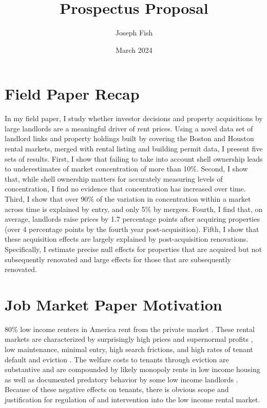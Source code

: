 \documentclass{article}
\title{Prospectus Proposal}
\author{Joseph Fish}
\date{March 2024}
\begin{document}
\section{Field Paper Recap}
In my field paper, I study whether investor decisions and property acquisitions by large landlords are a meaningful driver of rent prices. Using a novel data set of landlord links and property holdings built by \cite{Gomory_2024} covering the Boston and Houston rental markets, merged with rental listing and building permit data, I present five sets of results. First, I show that failing to take into account shell ownership leads to underestimates of market concentration of more than 10\%. Second, I show that, while shell ownership matters for accurately measuring levels of concentration, I find no evidence that concentration has increased over time. Third, I show that over 90\% of the variation in concentration within a market across time is explained by entry, and only 5\% by mergers. Fourth, I find that, on average, landlords raise prices by 1.7 percentage points after acquiring properties (over 4 percentage points by the fourth year post-acquisition). Fifth, I show that these acquisition effects are largely explained by post-acquisition renovations. Specifically, I estimate precise null effects for properties that are acquired but not subsequently renovated and large effects for those that are subsequently renovated.

\section{Job Market Paper Motivation}

80\% low income renters in America rent from the private market \parencite{jchs_2024, nhpd2024profiles}. These rental markets are characterized by surprisingly high prices and supernormal profits \parencite{Desmond_2019, Damen_2025,Eisfeldt_2015}, low maintenance, minimal entry, high search frictions, and high rates of tenant default \parencite{humphries-2024} and eviction \parencite{Gromis-et-al-2022}. The welfare costs to tenants through eviction are substantive \parencite{collison-et-al-2023, graetz-at-al-2023, desmond-evicted, humphries2025} and are compounded by likely monopoly rents in low income housing as well as documented predatory behavior by some low income landlords \parencite{desmond-evicted}. Because of these negative effects on tenants, there is obvious scope and justification for regulation of and intervention into the low income rental market.\\
\end{document}
